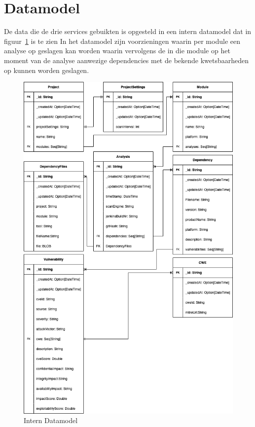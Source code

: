 \section{Datamodel}\label{subsec:intern-datamodel}
De data die de drie services gebuikten is opgesteld in een intern datamodel dat in figuur~\ref{fig:SOUP-SoupApiDm} is te zien In het datamodel zijn voorzieningen waarin per module een analyse op geslagen kan worden waarin vervolgens de in die module op het moment van de analyse aanwezige dependencies met de bekende kwetsbaarheden op kunnen worden geslagen.
\begin{figure}[H]
    \myfloatalign
    \includegraphics[width=12cm]{gfx/SOUPAPI-SOUPAPI DM}
    \caption{Intern Datamodel}
    \label{fig:SOUP-SoupApiDm}
\end{figure}


